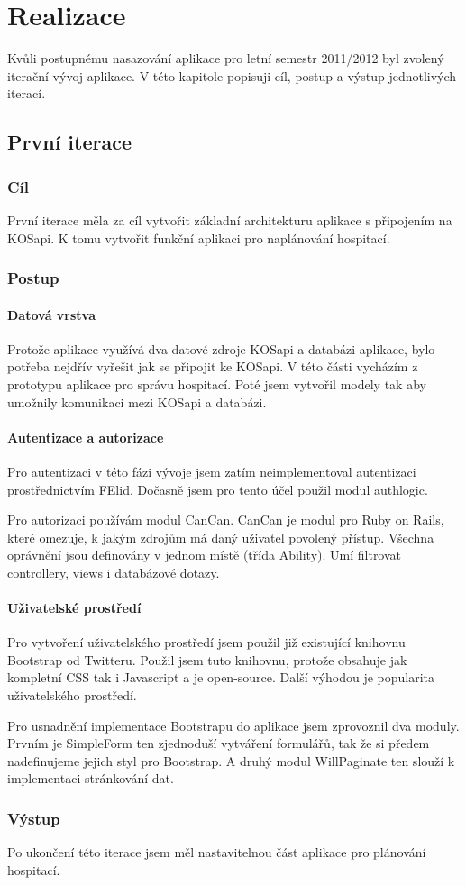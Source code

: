 \chapter{Realizace}
Kvůli postupnému nasazování aplikace pro letní semestr 2011/2012 byl zvolený iterační vývoj aplikace. V této kapitole popisuji cíl, postup a výstup jednotlivých iterací.

\section{První iterace}
\subsection{Cíl}
První iterace měla za cíl vytvořit základní architekturu aplikace s připojením na KOSapi. K tomu vytvořit funkční aplikaci pro naplánování hospitací.

\subsection{Postup}
\subsubsection{Datová vrstva}
Protože aplikace využívá dva datové zdroje KOSapi a databázi aplikace, bylo potřeba nejdřív vyřešit jak se připojit ke KOSapi. V této části vycházím z prototypu aplikace pro správu hospitací. Poté jsem vytvořil modely tak aby umožnily komunikaci mezi KOSapi a databázi.

\subsubsection{Autentizace a autorizace}
Pro autentizaci v této fázi vývoje jsem zatím neimplementoval autentizaci prostřednictvím FElid. Dočasně jsem pro tento účel použil modul authlogic.

Pro autorizaci používám modul CanCan. CanCan je modul pro Ruby on Rails, které omezuje, k jakým zdrojům má daný uživatel povolený přístup. Všechna oprávnění jsou definovány v jednom místě (třída Ability). Umí filtrovat controllery, views i databázové dotazy.

\subsubsection{Uživatelské prostředí}
Pro vytvoření uživatelského prostředí jsem použil již existující knihovnu Bootstrap od Twitteru. Použil jsem tuto knihovnu, protože obsahuje jak kompletní CSS tak i Javascript a je open-source. Další výhodou je popularita uživatelského prostředí.

Pro usnadnění implementace Bootstrapu do aplikace jsem zprovoznil dva moduly. Prvním je SimpleForm ten zjednoduší vytváření formulářů, tak že si předem nadefinujeme jejich styl pro Bootstrap. A druhý modul WillPaginate ten slouží k implementaci stránkování dat.

\subsection{Výstup} 
Po ukončení této iterace jsem měl nastavitelnou část aplikace pro plánování hospitací.
